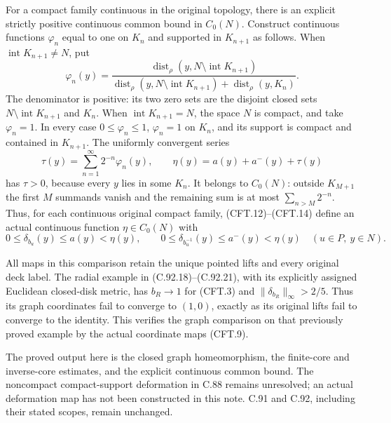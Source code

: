 \documentclass[11pt,a4paper]{article}
\begin{document}
For a compact family continuous in the original topology,
there is an explicit strictly positive continuous common
bound in $C_0(N)$. Construct continuous functions $\varphi_n$
equal to one on $K_n$ and supported in $K_{n+1}$ as follows.
When $\operatorname{int}K_{n+1}\ne N$, put
\[
 \varphi_n(y)=
 \frac{\operatorname{dist}_\rho(y,N\setminus\operatorname{int}K_{n+1})}
 {\operatorname{dist}_\rho(y,N\setminus\operatorname{int}K_{n+1})
           +\operatorname{dist}_\rho(y,K_n)}.
                                                               \tag{CFT.13}
\]
The denominator is positive: its two zero sets are the
disjoint closed sets $N\setminus\operatorname{int}K_{n+1}$
and $K_n$. When $\operatorname{int}K_{n+1}=N$, the space $N$
is compact, and take $\varphi_n=1$. In every case
$0\leq\varphi_n\leq1$, $\varphi_n=1$ on $K_n$, and its
support is compact and contained in $K_{n+1}$.
The uniformly convergent series
\[
 \tau(y)=\sum_{n=1}^{\infty}2^{-n}\varphi_n(y),\qquad
 \eta(y)=a(y)+a^-(y)+\tau(y)
                                                               \tag{CFT.14}
\]
has $\tau>0$, because every $y$ lies in some $K_n$.
It belongs to $C_0(N)$: outside $K_{M+1}$ the first $M$
summands vanish and the remaining sum is at most
$\sum_{n>M}2^{-n}$. Thus, for each continuous original
compact family, (CFT.12)--(CFT.14) define an actual continuous
function $\eta\in C_0(N)$ with
\[
 0\leq\delta_{b_u}(y)\leq a(y)<\eta(y),\qquad
 0\leq\delta_{b_u^{-1}}(y)\leq a^-(y)<\eta(y)
                  \quad(u\in P,\ y\in N).
                                                               \tag{CFT.15}
\]

All maps in this comparison retain the unique pointed lifts
and every original deck label. The radial example in
(C.92.18)--(C.92.21), with its explicitly assigned Euclidean
closed-disk metric, has $b_R\to1$ for (CFT.3) and
$\|\delta_{b_R}\|_\infty>2/5$. Thus its graph coordinates
fail to converge to $(1,0)$, exactly as its original lifts
fail to converge to the identity. This verifies the graph
comparison on that previously proved example by the actual
coordinate maps (CFT.9).

The proved output here is the closed graph homeomorphism,
the finite-core and inverse-core estimates, and the explicit
continuous common bound. The noncompact compact-support
deformation in C.88 remains unresolved; an actual deformation
map has not been constructed in this note. C.91 and C.92,
including their stated scopes, remain unchanged.
\end{document}
